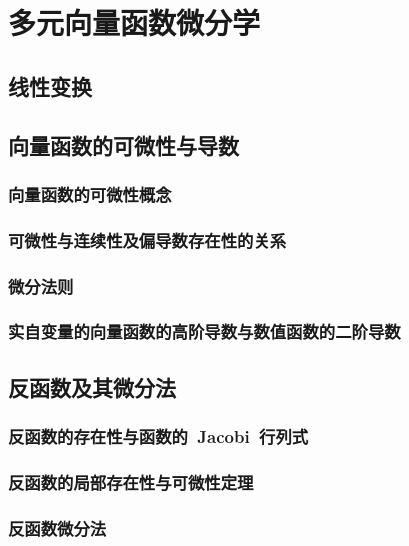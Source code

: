 

\chapter{多元向量函数微分学}\label{ch:17}
\section{线性变换}
\begin{exercise}
\item
\end{exercise}
\section{向量函数的可微性与导数}
\subsection{向量函数的可微性概念}
\subsection{可微性与连续性及偏导数存在性的关系}
\subsection{微分法则}
\subsection{实自变量的向量函数的高阶导数与数值函数的二阶导数}
\begin{exercise}
\item
\end{exercise}
\section{反函数及其微分法}
\subsection{反函数的存在性与函数的~Jacobi~行列式}
\subsection{反函数的局部存在性与可微性定理}
\subsection{反函数微分法}
\begin{exercise}
\item
\end{exercise}
